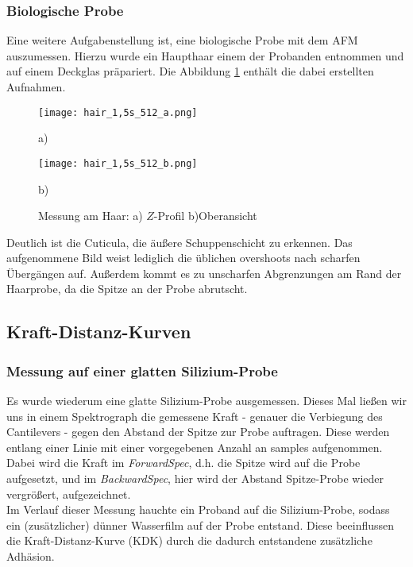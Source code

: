 \subsubsection{Biologische Probe}
Eine weitere Aufgabenstellung ist, eine biologische Probe mit dem AFM auszumessen. Hierzu wurde ein Haupthaar einem der Probanden entnommen und auf einem Deckglas präpariert. Die Abbildung \ref{fig:hair} enthält die dabei erstellten Aufnahmen.
\begin{figure}[h]
\centering
	\begin{minipage}{0.45\textwidth}
	\centering
		\texttt{[image: hair\_1,5s\_512\_a.png]}
		\caption*{a)}
	\end{minipage}
	\hfill
	\begin{minipage}{0.45\textwidth}
	\centering
		\texttt{[image: hair\_1,5s\_512\_b.png]}
		\caption*{b)}
	\end{minipage}
	\caption[Messung am Haar]{Messung am Haar: a) $Z$-Profil b)Oberansicht}
	\label{fig:hair}
\end{figure}
Deutlich ist die Cuticula, die äußere Schuppenschicht zu erkennen. Das aufgenommene Bild weist lediglich die üblichen overshoots nach scharfen Übergängen auf. Außerdem kommt es zu unscharfen Abgrenzungen am Rand der Haarprobe, da die Spitze an der Probe abrutscht.
\subsection{Kraft-Distanz-Kurven}
\subsubsection{Messung auf einer glatten Silizium-Probe}
Es wurde wiederum eine glatte Silizium-Probe ausgemessen. Dieses Mal ließen wir uns in einem Spektrograph die gemessene Kraft - genauer die Verbiegung des Cantilevers - gegen den Abstand der Spitze zur Probe auftragen. Diese werden entlang einer Linie mit einer vorgegebenen Anzahl an samples aufgenommen.\\
Dabei wird die Kraft im \emph{ForwardSpec}, d.h. die Spitze wird auf die Probe aufgesetzt, und im \emph{BackwardSpec}, hier wird der Abstand Spitze-Probe wieder vergrößert, aufgezeichnet.\\
Im Verlauf dieser Messung hauchte ein Proband auf die Silizium-Probe, sodass ein (zusätzlicher) dünner Wasserfilm auf der Probe entstand. Diese beeinflussen die Kraft-Distanz-Kurve (KDK) durch die dadurch entstandene zusätzliche Adhäsion.

